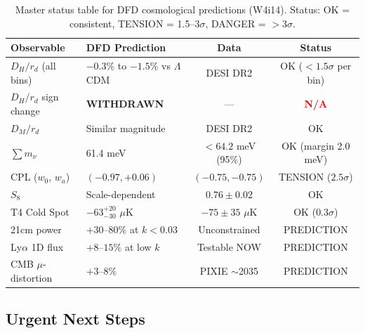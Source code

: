 \documentclass[11pt,a4paper]{article}
\newcommand{\LCDM}{$\Lambda$CDM}
\begin{document}
\begin{table}[H]
\centering
\caption{Master status table for DFD cosmological predictions (W4i14).
Status: OK = consistent, TENSION = 1.5--3$\sigma$, DANGER = $>$3$\sigma$.}
\label{tab:master-status}
\small
\begin{tabular}{llcc}
\toprule
\textbf{Observable} & \textbf{DFD Prediction} & \textbf{Data} & \textbf{Status} \\
\midrule
$D_H/r_d$ (all bins) & $-0.3\%$ to $-1.5\%$ vs \LCDM &
  DESI DR2 & OK ($<1.5\sigma$ per bin) \\
$D_H/r_d$ sign change & \textbf{WITHDRAWN} & --- &
  \textcolor{red}{\textbf{N/A}} \\
$D_M/r_d$ & Similar magnitude & DESI DR2 & OK \\
$\sum m_\nu$ & 61.4 meV & $<64.2$ meV (95\%) & OK (margin 2.0 meV) \\
CPL ($w_0$, $w_a$) & $(-0.97, +0.06)$ &
  $(-0.75, -0.75)$ & TENSION ($2.5\sigma$) \\
$S_8$ & Scale-dependent & $0.76 \pm 0.02$ & OK \\
T4 Cold Spot & $-63^{+20}_{-30}$ $\mu$K &
  $-75 \pm 35$ $\mu$K & OK ($0.3\sigma$) \\
21cm power & $+30$--$80\%$ at $k < 0.03$ & Unconstrained & PREDICTION \\
Ly$\alpha$ 1D flux & $+8$--$15\%$ at low $k$ & Testable NOW & PREDICTION \\
CMB $\mu$-distortion & $+3$--$8\%$ & PIXIE $\sim$2035 & PREDICTION \\
\bottomrule
\end{tabular}
\end{table}

\subsection{Urgent Next Steps}
\end{document}
